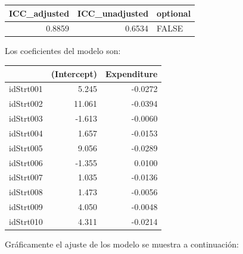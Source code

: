 \documentclass[
  spanish,
  12pt,
]{book}
\newenvironment{Shaded}{\begin{snugshade}}{\end{snugshade}}
\newcommand{\DataTypeTok}[1]{\textcolor[rgb]{0.13,0.29,0.53}{#1}}
\newcommand{\DecValTok}[1]{\textcolor[rgb]{0.00,0.00,0.81}{#1}}
\newcommand{\FunctionTok}[1]{\textcolor[rgb]{0.13,0.29,0.53}{\textbf{#1}}}
\newcommand{\NormalTok}[1]{#1}
\newcommand{\SpecialCharTok}[1]{\textcolor[rgb]{0.81,0.36,0.00}{\textbf{#1}}}
\begin{document}
\begin{tabular}{r|r|l}
\hline
ICC\_adjusted & ICC\_unadjusted & optional\\
\hline
0.8859 & 0.6534 & FALSE\\
\hline
\end{tabular}

Los coeficientes del modelo son:

\begin{Shaded}
\end{Shaded}

\begin{tabular}{l|r|r}
\hline
  & (Intercept) & Expenditure\\
\hline
idStrt001 & 5.245 & -0.0272\\
\hline
idStrt002 & 11.061 & -0.0394\\
\hline
idStrt003 & -1.613 & -0.0060\\
\hline
idStrt004 & 1.657 & -0.0153\\
\hline
idStrt005 & 9.056 & -0.0289\\
\hline
idStrt006 & -1.355 & 0.0100\\
\hline
idStrt007 & 1.035 & -0.0136\\
\hline
idStrt008 & 1.473 & -0.0056\\
\hline
idStrt009 & 4.050 & -0.0048\\
\hline
idStrt010 & 4.311 & -0.0214\\
\hline
\end{tabular}

Gráficamente el ajuste de los modelo se muestra a continuación:
\end{document}
